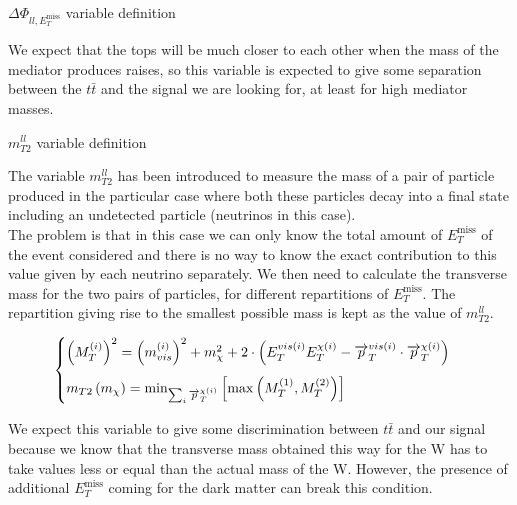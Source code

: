 \documentclass[8 pt]{beamer}
\begin{document}
\begin{frame}{$\Delta \Phi_{ll, E_T^{\text{miss}}}$ variable definition}
   \begin{block}{}
   \vspace{5pt}
   \justifying
   We expect that the tops will be much closer to each other when the mass of the mediator produces raises, so this variable is expected to give some separation between the $t \bar t$ and the signal we are looking for, at least for high mediator masses. \vspace{5pt}
   \end{block} \vfill

\end{frame}


\begin{frame}{$m_{T2}^{ll}$ variable definition}

   	\justifying
	The variable $m_{T2}^{ll}$ has been introduced to measure the mass of a pair of particle produced in the particular case where both these particles decay into a final state including an undetected particle (neutrinos in this case). \\ \vspace{8pt}
	The problem is that in this case we can only know the total amount of $E_T^{\text{miss}}$ of the event considered and there is no way to know the exact contribution to this value given by each neutrino separately. We then need to calculate the transverse mass for the two pairs of particles, for different repartitions of $E_T^{\text{miss}}$. The repartition giving rise to the smallest possible mass is kept as the value of $m_{T2}^{ll}$. \\ \vspace{8pt}
	
\begin{equation*}
	\begin{cases}
	\vspace{8pt}
	\left(M_T^{(i)}\right)^2 = \left(m_{vis}^{(i)}\right)^2 + m_{\chi}^2 + 2 \cdot \left(E_{T}^{vis(i)} E_{T}^{\chi(i)} - \overrightarrow{p}_{T}^{vis(i)} \cdot \overrightarrow{p}_{T}^{\chi(i)}\right) \\ 
m_{T2}\left(m_\chi \right) = \min_{\sum_{i}{\overrightarrow{p}_{T}^{\chi(i)}}}\left[{\max{\left(M_T^{(1)}, M_T^{(2)}\right)}}\right]
	\end{cases}
\end{equation*}
	
	\begin{block}{}
	\vspace{5pt}
	\justifying
	We expect this variable to give some discrimination between $t \bar t$ and our signal because we know that the transverse mass obtained this way for the W has to take values less or equal than the actual mass of the W. However, the presence of additional $E_T^{\text{miss}}$ coming for the dark matter can break this condition. \vspace{5pt}
	\end{block} \vfill

\end{frame}
\end{document}
